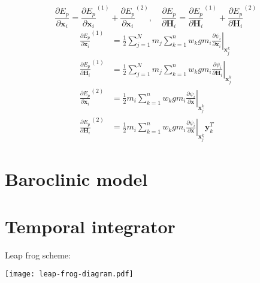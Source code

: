 \documentclass[slidestop,compress,mathserif]{beamer}
\begin{document}
\begin{frame}
  \begin{equation*}
    \frac{\partial E_p}{\partial \mathbf{x}_i} = {\frac{\partial E_p}{\partial \mathbf{x}_i}}^{(1)} + {\frac{\partial E_p}{\partial \mathbf{x}_i}}^{(2)}, \quad
    \frac{\partial E_p}{\partial \mathbf{H}_i} = {\frac{\partial E_p}{\partial \mathbf{H}_i}}^{(1)} + {\frac{\partial E_p}{\partial \mathbf{H}_i}}^{(2)}
  \end{equation*}
  \begin{align}
    {\frac{\partial E_p}{\partial \mathbf{x}_i}}^{(1)} & = \frac{1}{2} \sum_{j = 1}^{N} m_j \sum_{k = 1}^{n} w_k g m_i \left.\frac{\partial \psi_i}{\partial \mathbf{x}_i}\right|_{\mathbf{x}_j^k} \\
    {\frac{\partial E_p}{\partial \mathbf{H}_i}}^{(1)} & = \frac{1}{2} \sum_{j = 1}^{N} m_j \sum_{k = 1}^{n} w_k g m_i \left.\frac{\partial \psi_i}{\partial \mathbf{H}_i}\right|_{\mathbf{x}_j^k} \\
    {\frac{\partial E_p}{\partial \mathbf{x}_i}}^{(2)} & = \frac{1}{2} m_i \sum_{k = 1}^{n} w_k g m_i \left.\frac{\partial \psi_i}{\partial \mathbf{x}}\right|_{\mathbf{x}_j^k} \\
    {\frac{\partial E_p}{\partial \mathbf{H}_i}}^{(2)} & = \frac{1}{2} m_i \sum_{k = 1}^{n} w_k g m_i \left.\frac{\partial \psi_i}{\partial \mathbf{x}}\right|_{\mathbf{x}_j^k} \mathbf{y}_k^T
  \end{align}
\end{frame}

\section{Baroclinic model}
\label{sec:Baroclinic model}

\begin{frame}

\end{frame}

\section{Temporal integrator}
\label{sec:Temporal integrator}

\begin{frame}
  Leap frog scheme:
  \begin{center}
    \texttt{[image: leap-frog-diagram.pdf]}
  \end{center}
\end{frame}
\end{document}
